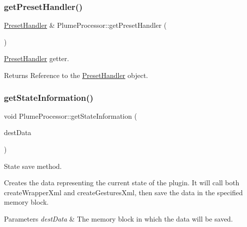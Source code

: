 \subsubsection{\texorpdfstring{get\+Preset\+Handler()}{getPresetHandler()}}
{\footnotesize\ttfamily \mbox{\hyperlink{class_preset_handler}{Preset\+Handler}} \& Plume\+Processor\+::get\+Preset\+Handler (\begin{DoxyParamCaption}{ }\end{DoxyParamCaption})}



\mbox{\hyperlink{class_preset_handler}{Preset\+Handler}} getter. 

\begin{DoxyReturn}{Returns}
Reference to the \mbox{\hyperlink{class_preset_handler}{Preset\+Handler}} object. 
\end{DoxyReturn}
\mbox{\label{class_plume_processor_ae06dd312c3dc3ba7389ce44fd74cbc18}} 
\subsubsection{\texorpdfstring{get\+State\+Information()}{getStateInformation()}}
{\footnotesize\ttfamily void Plume\+Processor\+::get\+State\+Information (\begin{DoxyParamCaption}\item[{Memory\+Block \&}]{dest\+Data }\end{DoxyParamCaption})\hspace{0.3cm}{\ttfamily [override]}}



State save method. 

Creates the data representing the current state of the plugin. It will call both create\+Wrapper\+Xml and create\+Gestures\+Xml, then save the data in the specified memory block.


\begin{DoxyParams}{Parameters}
{\em dest\+Data} & The memory block in which the data will be saved. \\
\hline
\end{DoxyParams}
\mbox{\label{class_plume_processor_a6ec4d89f181beea78034b81911c59aa8}} 
